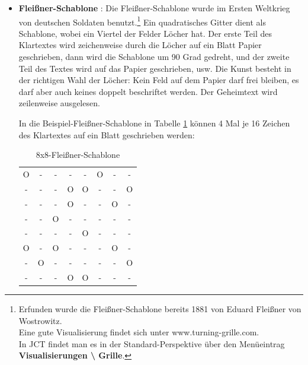 \begin{refsegment}
\begin{itemize}
   \hypertarget{turning-grille-cipher}{}   %
\item {\bf Fleißner-Schablone} \cite{Savard1999}%
   :
   Die Fleißner-Schablone wurde im Ersten Weltkrieg von deutschen Soldaten
   benutzt.\footnote{%
      Erfunden wurde die Fleißner-Schablone bereits 1881 von Eduard Fleißner
      von Wostrowitz.\\
      Eine gute Visualisierung findet sich unter www.turning-grille.com.\\
      In JCT findet man es in der Standard-Perspektive
      über den Menüeintrag {\bf Visualisierungen \textbackslash{} Grille}.
   }
   Ein quadratisches Gitter dient als Schablone, wobei ein Viertel der
   Felder Löcher hat. Der erste Teil des Klartextes wird zeichenweise
   durch die Löcher auf ein Blatt Papier geschrieben, dann wird die
   Schablone um 90 Grad gedreht, und der zweite Teil des Textes wird
   auf das Papier geschrieben, usw. Die Kunst besteht in der richtigen
   Wahl der Löcher: Kein Feld auf dem Papier darf frei bleiben, es
   darf aber auch keines doppelt beschriftet werden. Der Geheimtext
   wird zeilenweise ausgelesen.

   In die Beispiel-Fleißner-Schablone in Tabelle \ref{PaP_88Fleissner_table-reference}
   können 4 Mal je 16 Zeichen des Klartextes auf ein Blatt geschrieben werden:
   \begin{table}[ht]
   \begin{center}
   \begin{tabular}{|cccc|cccc|}
   \hline 	
	O & - & - & - & - & O & - & - \\
	- & - & - & O & O & - & - & O \\
	- & - & - & O & - & - & O & - \\
	- & - & O & - & - & - & - & - \\
   \hline 	
	- & - & - & - & O & - & - & - \\
	O & - & O & - & - & - & O & - \\
	- & O & - & - & - & - & - & O \\
	- & - & - & O & O & - & - & - \\
   \hline
   \end{tabular}
   \caption{8x8-Fleißner-Schablone}
   \label{PaP_88Fleissner_table-reference}
   \end{center}
   \end{table}

\end{itemize}



\end{refsegment}
